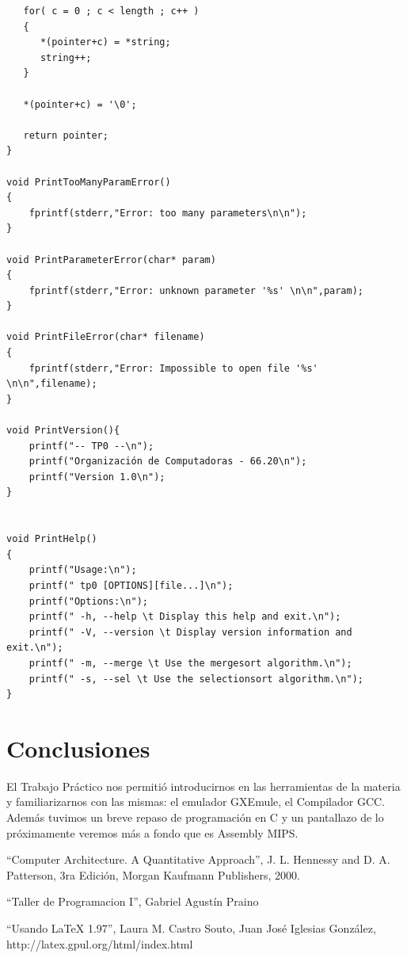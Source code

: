 \documentclass[a4paper,10pt]{article}
\begin{document}
\begin{tiny}
\begin{lstlisting}
   for( c = 0 ; c < length ; c++ )
   {
      *(pointer+c) = *string;
      string++;
   }

   *(pointer+c) = '\0';

   return pointer;
}

void PrintTooManyParamError()
{
    fprintf(stderr,"Error: too many parameters\n\n");
}

void PrintParameterError(char* param)
{
    fprintf(stderr,"Error: unknown parameter '%s' \n\n",param);
}

void PrintFileError(char* filename)
{
    fprintf(stderr,"Error: Impossible to open file '%s' \n\n",filename);
}

void PrintVersion(){
	printf("-- TP0 --\n");
	printf("Organización de Computadoras - 66.20\n");
	printf("Version 1.0\n");
}


void PrintHelp()
{
    printf("Usage:\n");
    printf(" tp0 [OPTIONS][file...]\n");
    printf("Options:\n");
    printf(" -h, --help \t Display this help and exit.\n");
    printf(" -V, --version \t Display version information and exit.\n");
    printf(" -m, --merge \t Use the mergesort algorithm.\n");
    printf(" -s, --sel \t Use the selectionsort algorithm.\n");
}

\end{lstlisting}
\end{tiny}


\newpage
\section{Conclusiones}
El Trabajo Práctico nos permitió introducirnos en las herramientas de la materia y familiarizarnos con las mismas: el emulador GXEmule, el Compilador GCC. Además tuvimos un breve repaso de programación en C y un pantallazo de lo próximamente veremos más a fondo que es Assembly MIPS.

\begin{thebibliography}{99}

 ``Computer Architecture. A Quantitative Approach'', J. L. Hennessy and D. A. Patterson, 3ra Edición, Morgan Kaufmann Publishers, 2000.

 ``Taller de Programacion I'', Gabriel Agustín Praino

 ``Usando \LaTeX{} 1.97'', Laura M. Castro Souto, Juan José Iglesias González, http://latex.gpul.org/html/index.html

\end{thebibliography}
\end{document}
